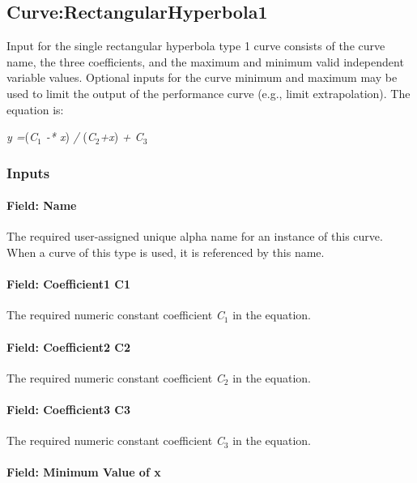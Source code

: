 \subsection{Curve:RectangularHyperbola1}\label{curverectangularhyperbola1}

Input for the single rectangular hyperbola type 1 curve consists of the curve name, the three coefficients, and the maximum and minimum valid independent variable values. Optional inputs for the curve minimum and maximum may be used to limit the output of the performance curve (e.g., limit extrapolation). The equation is:

\emph{y =}(\emph{C\(_{1}\) -* x}) \emph{/} (\emph{C\(_{2}\)+x}) \emph{+ C\(_{3}\)}

\subsubsection{Inputs}\label{inputs-15-008}

\paragraph{Field: Name}\label{field-name-15-005}

The required user-assigned unique alpha name for an instance of this curve. When a curve of this type is used, it is referenced by this name.

\paragraph{Field: Coefficient1 C1}\label{field-coefficient1-c1-2}

The required numeric constant coefficient \emph{C\(_{1}\)} in the equation.

\paragraph{Field: Coefficient2 C2}\label{field-coefficient2-c2-2}

The required numeric constant coefficient \emph{C\(_{2}\)} in the equation.

\paragraph{Field: Coefficient3 C3}\label{field-coefficient3-c3-2}

The required numeric constant coefficient \emph{C\(_{3}\)} in the equation.

\paragraph{Field: Minimum Value of x}\label{field-minimum-value-of-x-14}

